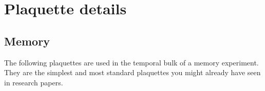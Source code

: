 \documentclass{article}
\begin{document}
\begin{longtable}{ |l|l|l|l| }
\end{longtable}

\newpage
\section{Plaquette details}

\subsection{Memory}

The following plaquettes are used in the temporal bulk of a memory experiment. They are 
the simplest and most standard plaquettes you might already have seen in research papers.
\end{document}
